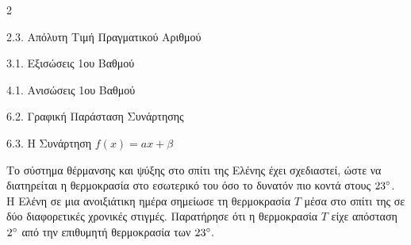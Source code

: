 \begin{ylh}{2}
    \item 2.3. Απόλυτη Τιμή Πραγματικού Αριθμού
    \item 3.1. Εξισώσεις 1ου Βαθμού
    \item 4.1. Ανισώσεις 1ου Βαθμού
    \item 6.2. Γραφική Παράσταση Συνάρτησης
    \item 6.3. Η Συνάρτηση $f(x)=ax+\beta$
\end{ylh}

Το σύστημα θέρμανσης και ψύξης στο σπίτι της Ελένης έχει σχεδιαστεί, ώστε να διατηρείται η θερμοκρασία στο εσωτερικό του όσο το δυνατόν πιο κοντά στους $23\degree$. Η Ελένη σε μια ανοιξιάτικη ημέρα σημείωσε τη θερμοκρασία $T$ μέσα στο σπίτι της σε δύο διαφορετικές χρονικές στιγμές. Παρατήρησε ότι η θερμοκρασία $T$ είχε απόσταση $2\degree$ από την επιθυμητή θερμοκρασία των $23\degree.$

